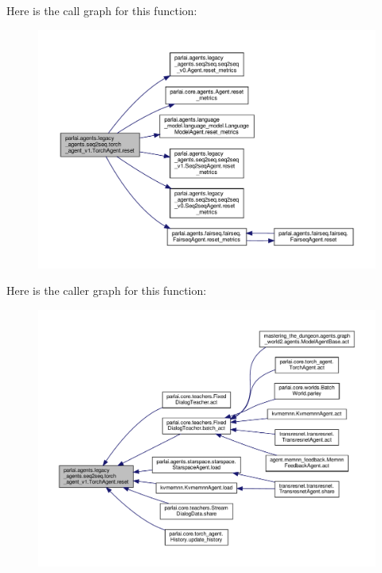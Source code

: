 Here is the call graph for this function\+:
\nopagebreak
\begin{figure}[H]
\begin{center}
\leavevmode
\includegraphics[width=350pt]{classparlai_1_1agents_1_1legacy__agents_1_1seq2seq_1_1torch__agent__v1_1_1TorchAgent_a93e935c0d2d589d8990ff14d6e528c4d_cgraph}
\end{center}
\end{figure}
Here is the caller graph for this function\+:
\nopagebreak
\begin{figure}[H]
\begin{center}
\leavevmode
\includegraphics[width=350pt]{classparlai_1_1agents_1_1legacy__agents_1_1seq2seq_1_1torch__agent__v1_1_1TorchAgent_a93e935c0d2d589d8990ff14d6e528c4d_icgraph}
\end{center}
\end{figure}
\mbox{\label{classparlai_1_1agents_1_1legacy__agents_1_1seq2seq_1_1torch__agent__v1_1_1TorchAgent_a4a01defa1d669571f574fcfe021776a8}} 
